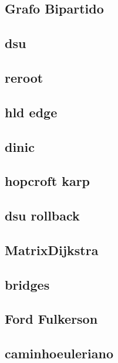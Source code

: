 \subsection{Grafo Bipartido}
\raggedbottom
\hrulefill
\subsection{dsu}
\raggedbottom
\hrulefill
\subsection{reroot}
\raggedbottom
\hrulefill
\subsection{hld edge}
\raggedbottom
\hrulefill
\subsection{dinic}
\raggedbottom
\hrulefill
\subsection{hopcroft karp}
\raggedbottom
\hrulefill
\subsection{dsu rollback}
\raggedbottom
\hrulefill
\subsection{MatrixDijkstra}
\raggedbottom
\hrulefill
\subsection{bridges}
\raggedbottom
\hrulefill
\subsection{Ford Fulkerson}
\raggedbottom
\hrulefill
\subsection{caminhoeuleriano}
\raggedbottom
\hrulefill
